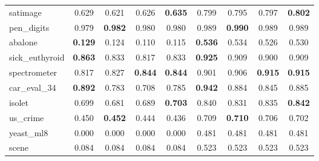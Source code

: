 \begin{figure}[ht]
\begin{tabular}{p{22mm}|*4{p{14mm}}|*4{p{14mm}}}
        satimage&\multicolumn{1}{c}{0.629}&\multicolumn{1}{c}{0.621}&\multicolumn{1}{c}{0.626}&\multicolumn{1}{c|}{\textbf{0.635}}&\multicolumn{1}{c}{0.799}&\multicolumn{1}{c}{0.795}&\multicolumn{1}{c}{0.797}&\multicolumn{1}{c}{\textbf{0.802}}\\
        pen\_digits&\multicolumn{1}{c}{0.979}&\multicolumn{1}{c}{\textbf{0.982}}&\multicolumn{1}{c}{0.980}&\multicolumn{1}{c|}{0.980}&\multicolumn{1}{c}{0.989}&\multicolumn{1}{c}{\textbf{0.990}}&\multicolumn{1}{c}{0.989}&\multicolumn{1}{c}{0.989}\\
        abalone&\multicolumn{1}{c}{\textbf{0.129}}&\multicolumn{1}{c}{0.124}&\multicolumn{1}{c}{0.110}&\multicolumn{1}{c|}{0.115}&\multicolumn{1}{c}{\textbf{0.536}}&\multicolumn{1}{c}{0.534}&\multicolumn{1}{c}{0.526}&\multicolumn{1}{c}{0.530}\\
        sick\_euthyroid&\multicolumn{1}{c}{\textbf{0.863}}&\multicolumn{1}{c}{0.833}&\multicolumn{1}{c}{0.817}&\multicolumn{1}{c|}{0.833}&\multicolumn{1}{c}{\textbf{0.925}}&\multicolumn{1}{c}{0.909}&\multicolumn{1}{c}{0.900}&\multicolumn{1}{c}{0.909}\\
        spectrometer&\multicolumn{1}{c}{0.817}&\multicolumn{1}{c}{0.827}&\multicolumn{1}{c}{\textbf{0.844}}&\multicolumn{1}{c|}{\textbf{0.844}}&\multicolumn{1}{c}{0.901}&\multicolumn{1}{c}{0.906}&\multicolumn{1}{c}{\textbf{0.915}}&\multicolumn{1}{c}{\textbf{0.915}}\\
        car\_eval\_34&\multicolumn{1}{c}{\textbf{0.892}}&\multicolumn{1}{c}{0.783}&\multicolumn{1}{c}{0.708}&\multicolumn{1}{c|}{0.785}&\multicolumn{1}{c}{\textbf{0.942}}&\multicolumn{1}{c}{0.884}&\multicolumn{1}{c}{0.845}&\multicolumn{1}{c}{0.885}\\
        isolet&\multicolumn{1}{c}{0.699}&\multicolumn{1}{c}{0.681}&\multicolumn{1}{c}{0.689}&\multicolumn{1}{c|}{\textbf{0.703}}&\multicolumn{1}{c}{0.840}&\multicolumn{1}{c}{0.831}&\multicolumn{1}{c}{0.835}&\multicolumn{1}{c}{\textbf{0.842}}\\
        us\_crime&\multicolumn{1}{c}{0.450}&\multicolumn{1}{c}{\textbf{0.452}}&\multicolumn{1}{c}{0.444}&\multicolumn{1}{c|}{0.436}&\multicolumn{1}{c}{0.709}&\multicolumn{1}{c}{\textbf{0.710}}&\multicolumn{1}{c}{0.706}&\multicolumn{1}{c}{0.702}\\
        yeast\_ml8&\multicolumn{1}{c}{0.000}&\multicolumn{1}{c}{0.000}&\multicolumn{1}{c}{0.000}&\multicolumn{1}{c|}{0.000}&\multicolumn{1}{c}{0.481}&\multicolumn{1}{c}{0.481}&\multicolumn{1}{c}{0.481}&\multicolumn{1}{c}{0.481}\\
        scene&\multicolumn{1}{c}{0.084}&\multicolumn{1}{c}{0.084}&\multicolumn{1}{c}{0.084}&\multicolumn{1}{c|}{0.084}&\multicolumn{1}{c}{0.523}&\multicolumn{1}{c}{0.523}&\multicolumn{1}{c}{0.523}&\multicolumn{1}{c}{0.523}\\

\end{tabular}
\end{figure}
